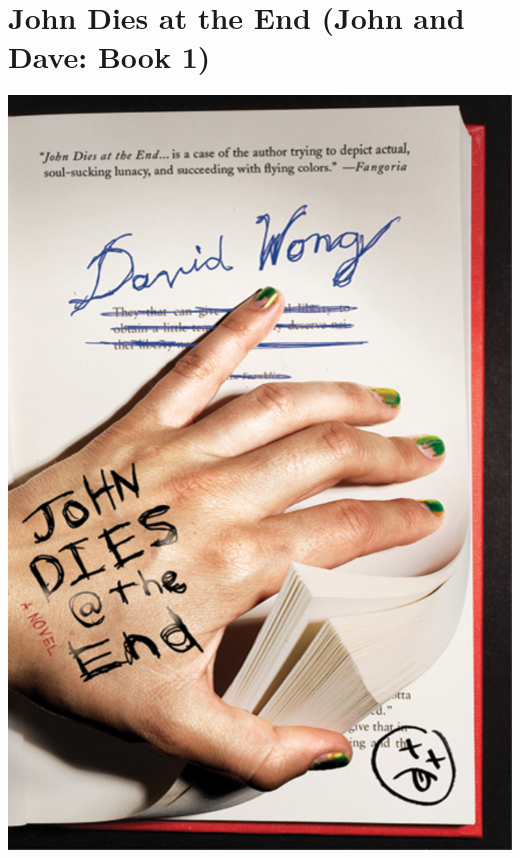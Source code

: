 \documentclass{tufte-handout}
\makeatletter
\newcommand{\varcaption}[2][0pt]{%
  \gsetlength{\@tufte@caption@vertical@offset}{-#1}%
  \gdef\@tufte@stored@varcaption{#2}%
}
\gdef\@tufte@stored@varcaption{} %
\makeatother
\begin{document}
\section*{John Dies at the End (John and Dave: Book 1)}
\begin{marginfigure}[3\baselineskip]
   \includegraphics[width=\linewidth]{images/john_dies_at_the_end.jpg}
   \varcaption{\href{https://us.macmillan.com/books/9780312659141}{Publisher Link}, \href{https://www.amazon.com/John-Dies-End-David-Wong/dp/1250035953}{Amazon Link}}
\end{marginfigure}
\end{document}
